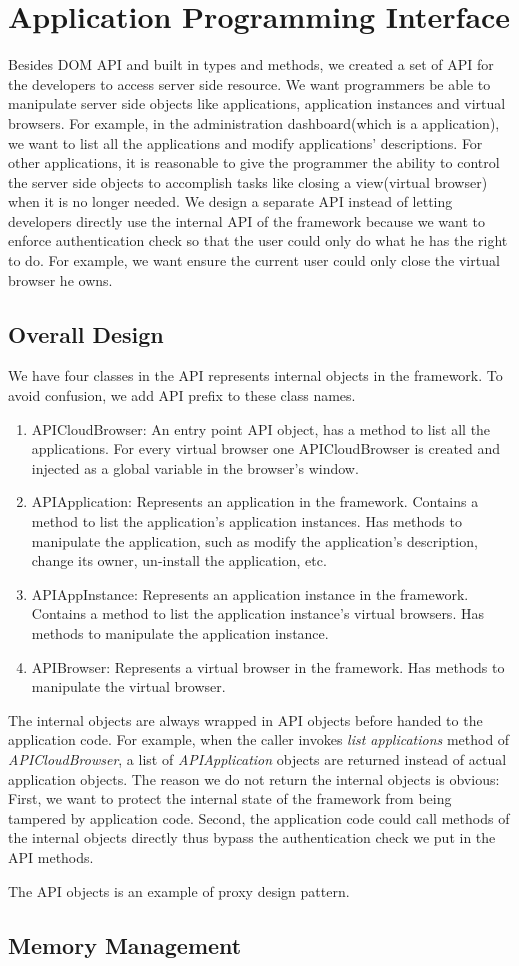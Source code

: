 \chapter{Application Programming Interface}
\label{ch:api}
Besides DOM API and built in types and methods,
we created a set of API for the developers to access server side resource.
We want programmers be able to manipulate server side objects like
applications, application instances and virtual browsers.
For example, in the administration dashboard(which is a \cb application),
we want to list all the applications and modify applications' descriptions.
For other applications, it is reasonable to give the programmer
the ability to control the server side objects to accomplish
tasks like closing a view(virtual browser) when it is no longer needed.
We design a separate API instead of letting developers directly use the internal
API of the framework because we want to enforce authentication check so that 
the user could only do what he has the right to do.
For example, we want ensure the current user could only close the virtual browser
he owns.

\section{Overall Design}
We have four classes in the API represents internal objects in the framework.
To avoid confusion, we add API prefix to these class names.

\begin{enumerate}
\item APICloudBrowser: An entry point API object, 
has a method to list all the applications. 
For every virtual browser one APICloudBrowser is created and injected as
a global variable in the browser's window.

\item APIApplication: Represents an application in the framework.
Contains a method to list the application's application instances.
Has methods to manipulate the application, such as modify the application's
description, change its owner, un-install the application, etc.

\item APIAppInstance: Represents an application instance in the framework.
Contains a method to list the application instance's virtual browsers.
Has methods to manipulate the application instance.

\item APIBrowser: Represents a virtual browser in the framework.
Has methods to manipulate the virtual browser.
\end{enumerate}
The internal objects are always wrapped in API objects before handed
to the application code.
For example, when the caller invokes \emph{list applications} method
of \emph{APICloudBrowser}, a list of \emph{APIApplication} objects 
are returned instead of actual application objects.
The reason we do not return the internal objects is obvious:
First, we want to protect the internal state of the framework from 
being tampered by application code.
Second, 
the application code could call methods of the internal objects directly
thus bypass the authentication check we put in the API methods.


The API objects is an example of proxy design pattern.


\section{Memory Management}